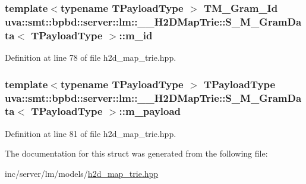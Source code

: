 \subsubsection[{m\+\_\+id}]{\setlength{\rightskip}{0pt plus 5cm}template$<$typename T\+Payload\+Type $>$ {\bf T\+M\+\_\+\+Gram\+\_\+\+Id} {\bf uva\+::smt\+::bpbd\+::server\+::lm\+::\+\_\+\+\_\+\+H2\+D\+Map\+Trie\+::\+S\+\_\+\+M\+\_\+\+Gram\+Data}$<$ T\+Payload\+Type $>$\+::m\+\_\+id}\label{structuva_1_1smt_1_1bpbd_1_1server_1_1lm_1_1_____h2_d_map_trie_1_1_s___m___gram_data_ad948066e5c69d58cf46c7c803711efbd}


Definition at line 78 of file h2d\+\_\+map\+\_\+trie.\+hpp.

\hypertarget{structuva_1_1smt_1_1bpbd_1_1server_1_1lm_1_1_____h2_d_map_trie_1_1_s___m___gram_data_afd5e80f9c1aac1133ee03f0a6f3b5212}{}
\subsubsection[{m\+\_\+payload}]{\setlength{\rightskip}{0pt plus 5cm}template$<$typename T\+Payload\+Type $>$ T\+Payload\+Type {\bf uva\+::smt\+::bpbd\+::server\+::lm\+::\+\_\+\+\_\+\+H2\+D\+Map\+Trie\+::\+S\+\_\+\+M\+\_\+\+Gram\+Data}$<$ T\+Payload\+Type $>$\+::m\+\_\+payload}\label{structuva_1_1smt_1_1bpbd_1_1server_1_1lm_1_1_____h2_d_map_trie_1_1_s___m___gram_data_afd5e80f9c1aac1133ee03f0a6f3b5212}


Definition at line 81 of file h2d\+\_\+map\+\_\+trie.\+hpp.



The documentation for this struct was generated from the following file\+:\begin{DoxyCompactItemize}
\item 
inc/server/lm/models/\hyperlink{h2d__map__trie_8hpp}{h2d\+\_\+map\+\_\+trie.\+hpp}\end{DoxyCompactItemize}
